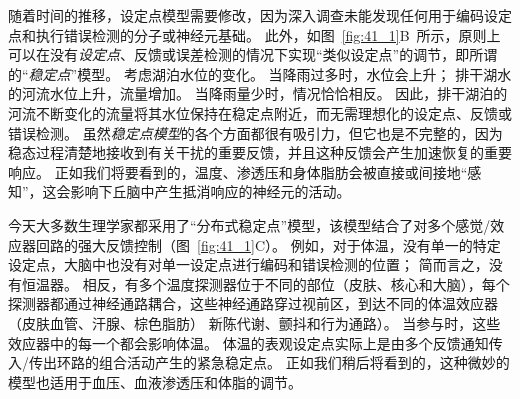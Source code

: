 随着时间的推移，设定点模型需要修改，因为深入调查未能发现任何用于编码设定点和执行错误检测的分子或神经元基础。
此外，如图~\ref{fig:41_1}B~所示，原则上可以在没有\textit{设定点}、反馈或误差检测的情况下实现“类似设定点”的调节，即所谓的“\textit{稳定点}”模型。
考虑湖泊水位的变化。
当降雨过多时，水位会上升；
排干湖水的河流水位上升，流量增加。
当降雨量少时，情况恰恰相反。
因此，排干湖泊的河流不断变化的流量将其水位保持在稳定点附近，而无需理想化的设定点、反馈或错误检测。
虽然\textit{稳定点模型}的各个方面都很有吸引力，但它也是不完整的，因为稳态过程清楚地接收到有关干扰的重要反馈，并且这种反馈会产生加速恢复的重要响应。
正如我们将要看到的，温度、渗透压和身体脂肪会被直接或间接地“感知”，这会影响下丘脑中产生抵消响应的神经元的活动。


今天大多数生理学家都采用了“分布式稳定点”模型，该模型结合了对多个感觉/效应器回路的强大反馈控制（图~\ref{fig:41_1}C）。
例如，对于体温，没有单一的特定设定点，大脑中也没有对单一设定点进行编码和错误检测的位置；
简而言之，没有恒温器。
相反，有多个温度探测器位于不同的部位（皮肤、核心和大脑），每个探测器都通过神经通路耦合，这些神经通路穿过视前区，到达不同的体温效应器（皮肤血管、汗腺、棕色脂肪） 新陈代谢、颤抖和行为通路）。
当参与时，这些效应器中的每一个都会影响体温。
体温的表观设定点实际上是由多个反馈通知传入/传出环路的组合活动产生的紧急稳定点。
正如我们稍后将看到的，这种微妙的模型也适用于血压、血液渗透压和体脂的调节。


